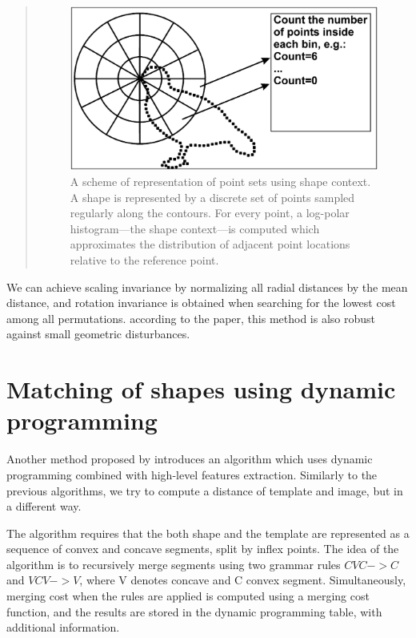 \begin{quotation}
\begin{figure}
\centering
\includegraphics[width=\linewidth]{ext/polarbins.png}
\caption{A scheme of representation of point sets using shape context.
A shape is represented by a discrete set of points sampled regularly along
the contours. For every point, a log-polar histogram—the shape context—is
computed which approximates the distribution of adjacent point locations
relative to the reference point. \citet{simple}}
\label{fig:polarbins}
\end{figure}
\end{quotation}

We can achieve scaling invariance by normalizing all radial distances by the mean distance, and rotation invariance is obtained when searching for the lowest cost among all permutations. according to the paper, this method is also robust against small geometric disturbances.

\section{Matching of shapes using dynamic programming}
Another method proposed by \citet{convex} introduces an algorithm which uses dynamic programming combined with high-level features extraction. Similarly to the previous algorithms, we try to compute a distance of template and image, but in a different way.

The algorithm requires that the both shape and the template are represented as a sequence of convex and concave segments, split by inflex points. The idea of the algorithm is to recursively merge segments using two grammar rules $CVC -> C$ and $VCV -> V$, where V denotes concave and C convex segment. Simultaneously, merging cost when the rules are applied is computed using a merging cost function, and the results are stored in the dynamic programming table, with additional information.

